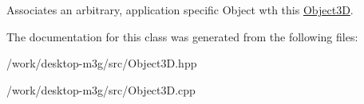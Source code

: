 Associates an arbitrary, application specific Object wth this \hyperlink{classm3g_1_1Object3D}{Object3D}. 

The documentation for this class was generated from the following files:\begin{CompactItemize}
\item 
/work/desktop-m3g/src/Object3D.hpp\item 
/work/desktop-m3g/src/Object3D.cpp\end{CompactItemize}
